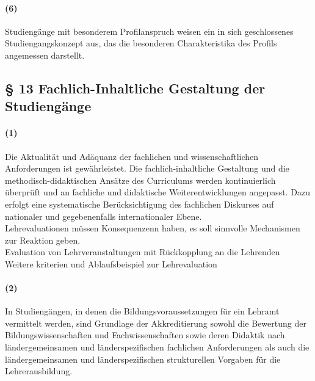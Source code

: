 \documentclass[a4paper]{scrartcl}
\begin{document}
\paragraph{(6)} Studiengänge mit besonderem Profilanspruch weisen ein in sich geschlossenes Studiengangskonzept aus, das die besonderen Charakteristika des Profils angemessen darstellt.

\subsection{§ 13 Fachlich-Inhaltliche Gestaltung der Studiengänge}
\paragraph{(1)} Die Aktualität und Adäquanz der fachlichen und wissenschaftlichen Anforderungen ist gewährleistet. Die fachlich-inhaltliche Gestaltung und die methodisch-didaktischen Ansätze des Curriculums werden kontinuierlich überprüft und an fachliche und didaktische Weiterentwicklungen angepasst.
Dazu erfolgt eine systematische Berücksichtigung des fachlichen Diskurses auf nationaler und gegebenenfalls internationaler Ebene.\\

\textcolor{Bernd}{\textbf{\cite{PROT: SoSe2018-Akk}} Lehrevaluationen müssen Konsequenzenn haben, es soll sinnvolle Mechanismen zur Reaktion geben.}\\ %


\textcolor{Bernd}{\textbf{\cite{PROT: WiSe2015-RL}} Evaluation von Lehrveranstaltungen mit Rückkopplung an die Lehrenden}\\

\textcolor{Bernd}{\textbf{\cite{RESO: SoSe2013-SysAkk}} Weitere kriterien und Ablaufsbeispiel zur Lehrevaluation}


\paragraph{(2)} In Studiengängen, in denen die Bildungsvoraussetzungen für ein Lehramt vermittelt werden, sind Grundlage der Akkreditierung sowohl die Bewertung der Bildungswissenschaften und Fachwissenschaften sowie deren Didaktik
nach ländergemeinsamen und länderspezifischen fachlichen Anforderungen als auch die ländergemeinsamen und länderspezifischen strukturellen Vorgaben für die Lehrerausbildung.
\end{document}
